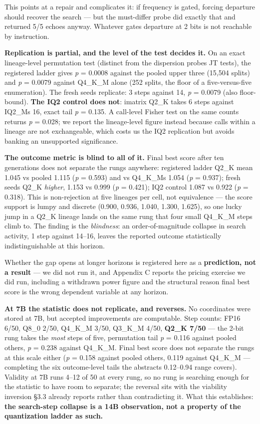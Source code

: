 This points at a repair and complicates it: if frequency is gated, forcing departure should recover the search --- but the must-differ probe did exactly that and returned 5/5 echoes anyway. Whatever gates departure at 2 bits is not reachable by instruction.

\textbf{Replication is partial, and the level of the test decides it.} On an exact lineage-level permutation test (distinct from the dispersion probes\textquotesingle{} JT tests), the registered ladder gives \emph{p} = 0.0008 against the pooled upper three (15,504 splits) and \emph{p} = 0.0079 against Q4\_K\_M alone (252 splits, the floor of a five-versus-five enumeration). The fresh seeds replicate: 3 steps against 14, \emph{p} = 0.0079 (also floor-bound). \textbf{The IQ2 control does not}: imatrix Q2\_K takes 6 steps against IQ2\_M\textquotesingle s 16, exact tail \emph{p} = 0.135. A call-level Fisher test on the same counts returns \emph{p} = 0.028; we report the lineage-level figure instead because calls within a lineage are not exchangeable, which costs us the IQ2 replication but avoids banking an unsupported significance.

\textbf{The outcome metric is blind to all of it.} Final best score after ten generations does not separate the rungs anywhere: registered ladder Q2\_K mean 1.045 vs pooled 1.115 (\emph{p} = 0.593) and vs Q4\_K\_M\textquotesingle s 1.054 (\emph{p} = 0.937); fresh seeds Q2\_K \emph{higher}, 1.153 vs 0.999 (\emph{p} = 0.421); IQ2 control 1.087 vs 0.922 (\emph{p} = 0.318). This is non-rejection at five lineages per cell, not equivalence --- the score support is lumpy and discrete (0.900, 0.936, 1.040, 1.300, 1.625), so one lucky jump in a Q2\_K lineage lands on the same rung that four small Q4\_K\_M steps climb to. The finding is the \emph{blindness}: an order-of-magnitude collapse in search activity, 1 step against 14--16, leaves the reported outcome statistically indistinguishable at this horizon.

Whether the gap opens at longer horizons is registered here as a \textbf{prediction, not a result} --- we did not run it, and Appendix C reports the pricing exercise we did run, including a withdrawn power figure and the structural reason final best score is the wrong dependent variable at any horizon.

\textbf{At 7B the statistic does not replicate, and reverses.} No coordinates were stored at 7B, but accepted improvements are computable. Step counts: FP16 6/50, Q8\_0 2/50, Q4\_K\_M 3/50, Q3\_K\_M 4/50, \textbf{Q2\_K 7/50} --- the 2-bit rung takes the \emph{most} steps of five, permutation tail \emph{p} = 0.116 against pooled others, \emph{p} = 0.238 against Q4\_K\_M. Final best score does not separate the rungs at this scale either (\emph{p} = 0.158 against pooled others, 0.119 against Q4\_K\_M --- completing the six outcome-level tails the abstract\textquotesingle s 0.12--0.94 range covers). Validity at 7B runs 4--12 of 50 at every rung, so no rung is searching enough for the statistic to have room to separate; the reversal sits with the viability inversion §3.3 already reports rather than contradicting it. What this establishes: \textbf{the search-step collapse is a 14B observation, not a property of the quantization ladder as such.}

